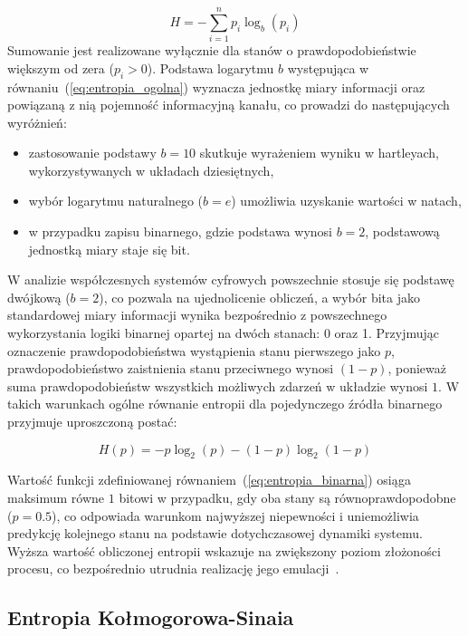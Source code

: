 \begin{equation}
H = -\sum_{i=1}^{n} p_i \log_b(p_i)
\label{eq:entropia_ogolna}
\end{equation}
Sumowanie jest realizowane wyłącznie dla stanów o prawdopodobieństwie większym od zera ($p_i > 0$). Podstawa logarytmu $b$ występująca w równaniu~(\ref{eq:entropia_ogolna}) wyznacza jednostkę miary informacji oraz powiązaną z nią pojemność informacyjną kanału, co prowadzi do następujących wyróżnień:
\begin{itemize}
    \item zastosowanie podstawy $b=10$ skutkuje wyrażeniem wyniku w hartleyach, wykorzystywanych w układach dziesiętnych,
    \item wybór logarytmu naturalnego ($b=e$) umożliwia uzyskanie wartości w natach,
    \item w przypadku zapisu binarnego, gdzie podstawa wynosi $b=2$, podstawową jednostką miary staje się bit.
\end{itemize}
 
W analizie współczesnych systemów cyfrowych powszechnie stosuje się podstawę dwójkową ($b=2$), co pozwala na ujednolicenie obliczeń, a wybór bita jako standardowej miary informacji wynika bezpośrednio z powszechnego wykorzystania logiki binarnej opartej na dwóch stanach: 0 oraz 1. Przyjmując oznaczenie prawdopodobieństwa wystąpienia stanu pierwszego jako $p$, prawdopodobieństwo zaistnienia stanu przeciwnego wynosi $(1-p)$, ponieważ suma prawdopodobieństw wszystkich możliwych zdarzeń w układzie wynosi $1$. W takich warunkach ogólne równanie entropii dla pojedynczego źródła binarnego przyjmuje uproszczoną postać:
 
\begin{equation}
H(p) = -p \log_2(p) - (1-p) \log_2(1-p)
\label{eq:entropia_binarna}
\end{equation}
 
Wartość funkcji zdefiniowanej równaniem~(\ref{eq:entropia_binarna}) osiąga maksimum równe $1$ bitowi w przypadku, gdy oba stany są równoprawdopodobne ($p=0.5$), co odpowiada warunkom najwyższej niepewności i uniemożliwia predykcję kolejnego stanu na podstawie dotychczasowej dynamiki systemu. Wyższa wartość obliczonej entropii wskazuje na zwiększony poziom złożoności procesu, co bezpośrednio utrudnia realizację jego emulacji~\cite{entropiaShannona4, entropiaShannona5, entropiaShannona6}.
 
\subsection{Entropia Kołmogorowa-Sinaia}
 
